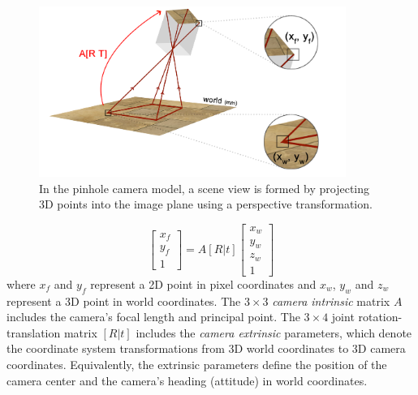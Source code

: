 \begin{figure}[htb]
\centering
\includegraphics[width=10cm]{images/mapping0.png}
\caption{In the pinhole camera model, a scene view is formed by projecting 3D points into the image plane using a perspective transformation.}
\label{fig:mapping1}
\end{figure}

\begin{equation}
\left[ {
\begin{array}{c} x_f \\ y_f \\ 1 \end{array}
} \right]
= A[R|t]
\left[ {
\begin{array}{c} x_w \\ y_w \\ z_w \\ 1 \end{array}
} \right]
\end{equation}
where $x_f$ and $y_f$ represent a 2D point in pixel coordinates and $x_w$, $y_w$ and $z_w$ represent a 3D point in world coordinates.
The $3 \times 3$ \textit{camera intrinsic} matrix $A$ includes the camera's focal length and principal point.
The $3 \times 4$ joint rotation-translation matrix $[R|t]$ includes the \textit{camera extrinsic} parameters, which denote the coordinate system transformations from 3D world coordinates to 3D camera coordinates. Equivalently, the extrinsic parameters define the position of the camera center and the camera's heading (attitude) in world coordinates.

